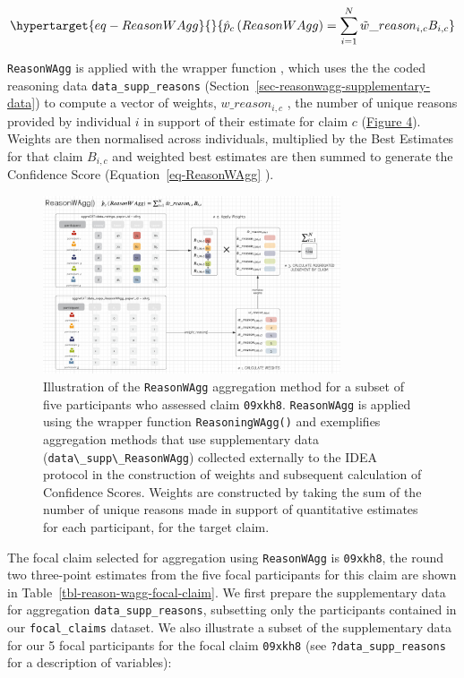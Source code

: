\documentclass[article]{jss}
\newcommand{\fct}[1]{\code{#1()}}
\begin{document}
\begin{equation}\protect\hypertarget{eq-ReasonWAgg}{}{
\hat{p}_c\left( ReasonWAgg \right) = \sum_{i=1}^N \tilde{w}\_reason_{i,c}B_{i,c}
}\label{eq-ReasonWAgg}\end{equation}

\texttt{ReasonWAgg} is applied with the wrapper function
\fct{ReasoningWAgg}, which uses the the coded reasoning data
\texttt{data\_supp\_reasons}
(Section~\ref{sec-reasonwagg-supplementary-data}) to compute a vector of
weights, \(w\_reason_{i,c}\) , the number of unique reasons provided by
individual \(i\) in support of their estimate for claim \(c\)
(\protect\hyperlink{fig-ReasonWAgg}{Figure 4}). Weights are then
normalised across individuals, multiplied by the Best Estimates for that
claim \(B_{i,c}\) and weighted best estimates are then summed to
generate the Confidence Score (Equation~\ref{eq-ReasonWAgg} ).

\begin{figure}

{\centering \includegraphics[width=3.46in,height=\textheight]{images/img_ReasonWAgg.png}

}

\caption{\label{fig-ReasonWAgg}Illustration of the \texttt{ReasonWAgg}
aggregation method for a subset of five participants who assessed claim
\texttt{09xkh8}. \texttt{ReasonWAgg} is applied using the wrapper
function \texttt{ReasoningWAgg()} and exemplifies aggregation methods
that use supplementary data
(\texttt{data\textbackslash{}\_supp\textbackslash{}\_ReasonWAgg})
collected externally to the IDEA protocol in the construction of weights
and subsequent calculation of Confidence Scores. Weights are constructed
by taking the sum of the number of unique reasons made in support of
quantitative estimates for each participant, for the target claim.}

\end{figure}

The focal claim selected for aggregation using \texttt{ReasonWAgg} is
\texttt{09xkh8}, the round two three-point estimates from the five focal
participants for this claim are shown in
Table~\ref{tbl-reason-wagg-focal-claim}. We first prepare the
supplementary data for aggregation \texttt{data\_supp\_reasons},
subsetting only the participants contained in our \texttt{focal\_claims}
dataset. We also illustrate a subset of the supplementary data for our 5
focal participants for the focal claim \texttt{09xkh8} (see
\texttt{?data\_supp\_reasons} for a description of variables):
\end{document}
